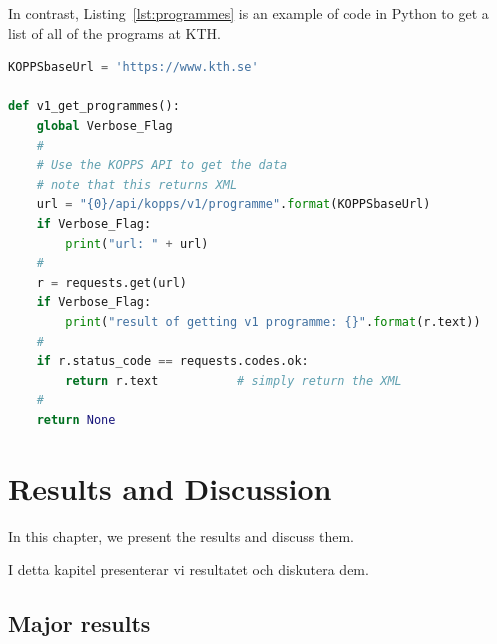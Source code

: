 \documentclass[english]{kththesis}
\newenvironment{swedishnotes}%
  {\begin{center}
      \selectlanguage{swedish}
      \color{blue}}%
    {\end{center}
    \selectlanguage{USenglish}}
\begin{document}
In contrast, Listing~\ref{lst:programmes} is an example of code in Python to
get a list of all of the programs at KTH.

\lstset{extendedchars=true}
\begin{lstlisting}[language={Python}, caption={Using a python program to
    access the KTH API to get all of the programs at KTH}, label=lst:programmes]
KOPPSbaseUrl = 'https://www.kth.se'

def v1_get_programmes():
    global Verbose_Flag
    #
    # Use the KOPPS API to get the data
    # note that this returns XML
    url = "{0}/api/kopps/v1/programme".format(KOPPSbaseUrl)
    if Verbose_Flag:
        print("url: " + url)
    #
    r = requests.get(url)
    if Verbose_Flag:
        print("result of getting v1 programme: {}".format(r.text))
    #
    if r.status_code == requests.codes.ok:
        return r.text           # simply return the XML
    #
    return None
\end{lstlisting}


\cleardoublepage
\chapter{Results and Discussion}
\label{ch:resultsAndDiscussion}

In this chapter, we present the results and discuss them.

\begin{swedishnotes}
I detta kapitel presenterar vi resultatet och diskutera dem.
\end{swedishnotes}

\section{Major results}
\end{document}
